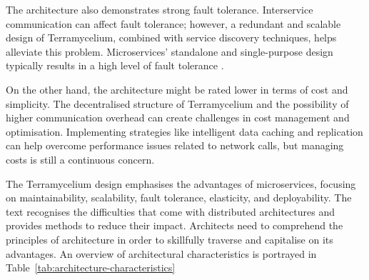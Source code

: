 \documentclass[preprint,12pt]{elsarticle}
\begin{document}
The architecture also demonstrates strong fault tolerance. Interservice communication can affect fault tolerance; however, a redundant and scalable design of Terramycelium, combined with service discovery techniques, helps alleviate this problem. Microservices' standalone and single-purpose design typically results in a high level of fault tolerance \cite{MStodaytomorrow}.

On the other hand, the architecture might be rated lower in terms of cost and simplicity. The decentralised structure of Terramycelium and the possibility of higher communication overhead can create challenges in cost management and optimisation. Implementing strategies like intelligent data caching and replication can help overcome performance issues related to network calls, but managing costs is still a continuous concern.

The Terramycelium design emphasises the advantages of microservices, focusing on maintainability, scalability, fault tolerance, elasticity, and deployability. The text recognises the difficulties that come with distributed architectures and provides methods to reduce their impact. Architects need to comprehend the principles of architecture in order to skillfully traverse and capitalise on its advantages. An overview of architectural characteristics is portrayed in Table~\ref{tab:architecture-characteristics}
\end{document}

